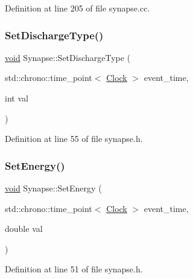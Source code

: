 Definition at line 205 of file synapse.\+cc.

\mbox{\label{class_synapse_a1956d553c15fa1aea12d39725baeca1b}} 
\subsubsection{\texorpdfstring{Set\+Discharge\+Type()}{SetDischargeType()}}
{\footnotesize\ttfamily \mbox{\hyperlink{glad_8h_a950fc91edb4504f62f1c577bf4727c29}{void}} Synapse\+::\+Set\+Discharge\+Type (\begin{DoxyParamCaption}\item[{std\+::chrono\+::time\+\_\+point$<$ \mbox{\hyperlink{universe_8h_a0ef8d951d1ca5ab3cfaf7ab4c7a6fd80}{Clock}} $>$}]{event\+\_\+time,  }\item[{int}]{val }\end{DoxyParamCaption})\hspace{0.3cm}{\ttfamily [inline]}}



Definition at line 55 of file synapse.\+h.

\mbox{\label{class_synapse_aa90b66763c8aca2ad8df535ffed5d4a9}} 
\subsubsection{\texorpdfstring{Set\+Energy()}{SetEnergy()}}
{\footnotesize\ttfamily \mbox{\hyperlink{glad_8h_a950fc91edb4504f62f1c577bf4727c29}{void}} Synapse\+::\+Set\+Energy (\begin{DoxyParamCaption}\item[{std\+::chrono\+::time\+\_\+point$<$ \mbox{\hyperlink{universe_8h_a0ef8d951d1ca5ab3cfaf7ab4c7a6fd80}{Clock}} $>$}]{event\+\_\+time,  }\item[{double}]{val }\end{DoxyParamCaption})\hspace{0.3cm}{\ttfamily [inline]}}



Definition at line 51 of file synapse.\+h.

\mbox{\label{class_synapse_a278f054df3f4ff25683787ba8fe78263}} 
